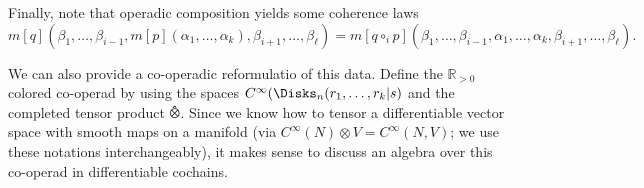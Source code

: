 Finally, note that operadic composition yields some coherence laws
\[
	m[q](\beta _1, \ldots , \beta _{i-1} , m[p](\alpha _1, \ldots , \alpha _k), \beta _{i+1} , \ldots , \beta_{\ell } )=m[q\circ _ip](\beta _1, \ldots , \beta _{i-1} ,\alpha _1, \ldots , \alpha _k, \beta _{i+1} , \ldots , \beta _{\ell } )
.\]


We can also provide a co-operadic reformulatio of this data. Define the $\mathbb{R} _{>0} $ colored co-operad by using the spaces $C^\infty (\Disks_n(r_1, \ldots , r_k | s)$ and the completed tensor product $\otimeshat$. Since we know how to tensor a differentiable vector space with smooth maps on a manifold (via $C^\infty (N)\otimes V = C^\infty (N,V)$; we use these notations interchangeably), it makes sense to discuss an algebra over this co-operad in differentiable cochains.

